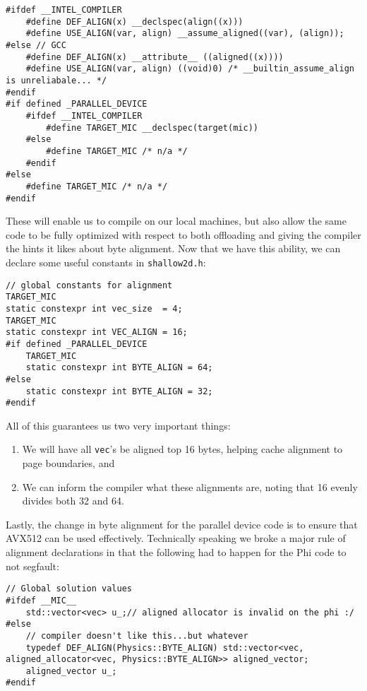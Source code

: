 {\tiny
\begin{lstlisting}
#ifdef __INTEL_COMPILER
    #define DEF_ALIGN(x) __declspec(align((x)))
    #define USE_ALIGN(var, align) __assume_aligned((var), (align));
#else // GCC
    #define DEF_ALIGN(x) __attribute__ ((aligned((x))))
    #define USE_ALIGN(var, align) ((void)0) /* __builtin_assume_align is unreliabale... */
#endif
#if defined _PARALLEL_DEVICE
    #ifdef __INTEL_COMPILER
        #define TARGET_MIC __declspec(target(mic))
    #else
        #define TARGET_MIC /* n/a */
    #endif
#else
    #define TARGET_MIC /* n/a */
#endif
\end{lstlisting}
}

These will enable us to compile on our local machines, but also allow the same code to be fully optimized with respect to both offloading and giving the compiler the hints it likes about byte alignment.  Now that we have this ability, we can declare some useful constants in \texttt{shallow2d.h}:

{\tiny
\begin{lstlisting}
// global constants for alignment
TARGET_MIC
static constexpr int vec_size  = 4;
TARGET_MIC
static constexpr int VEC_ALIGN = 16;
#if defined _PARALLEL_DEVICE
    TARGET_MIC
    static constexpr int BYTE_ALIGN = 64;
#else
    static constexpr int BYTE_ALIGN = 32;
#endif
\end{lstlisting}
}

All of this guarantees us two very important things:

\begin{enumerate}[1.]
    \item We will have all \texttt{vec}'s be aligned top 16 bytes, helping cache alignment to page boundaries, and
    \item We can inform the compiler what these alignments are, noting that 16 evenly divides both 32 and 64.
\end{enumerate}

Lastly, the change in byte alignment for the parallel device code is to ensure that AVX512 can be used effectively.  Technically speaking we broke a major rule of alignment declarations in that the following had to happen for the Phi code to not segfault:

{\tiny
\begin{lstlisting}
// Global solution values
#ifdef __MIC__
    std::vector<vec> u_;// aligned allocator is invalid on the phi :/
#else
    // compiler doesn't like this...but whatever
    typedef DEF_ALIGN(Physics::BYTE_ALIGN) std::vector<vec, aligned_allocator<vec, Physics::BYTE_ALIGN>> aligned_vector;
    aligned_vector u_;
#endif
\end{lstlisting}
}

